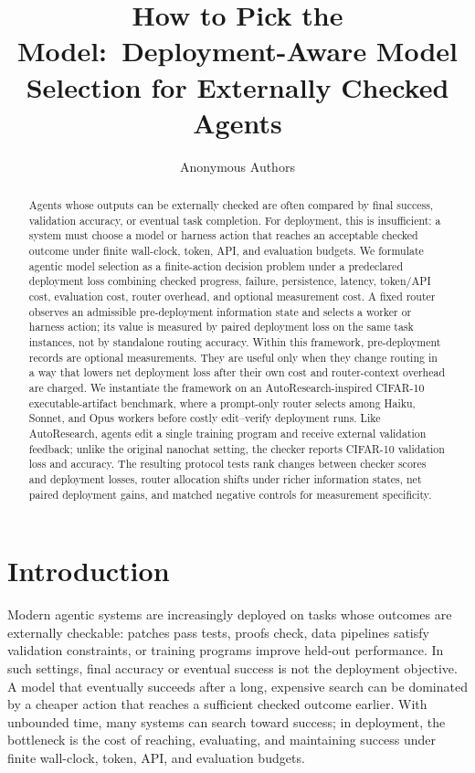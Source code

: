 \documentclass{article}
\title{How to Pick the Model:\
Deployment-Aware Model Selection for Externally Checked Agents}
\author{Anonymous Authors}
\begin{document}
\maketitle

\begin{abstract}
Agents whose outputs can be externally checked are often compared by final success, validation accuracy, or eventual task completion.
For deployment, this is insufficient: a system must choose a model or harness action that reaches an acceptable checked outcome under finite wall-clock, token, API, and evaluation budgets.
We formulate agentic model selection as a finite-action decision problem under a predeclared deployment loss combining checked progress, failure, persistence, latency, token/API cost, evaluation cost, router overhead, and optional measurement cost.
A fixed router observes an admissible pre-deployment information state and selects a worker or harness action; its value is measured by paired deployment loss on the same task instances, not by standalone routing accuracy.
Within this framework, pre-deployment records are optional measurements.
They are useful only when they change routing in a way that lowers net deployment loss after their own cost and router-context overhead are charged.
We instantiate the framework on an AutoResearch-inspired CIFAR-10 executable-artifact benchmark, where a prompt-only router selects among Haiku, Sonnet, and Opus workers before costly edit--verify deployment runs.
Like AutoResearch, agents edit a single training program and receive external validation feedback; unlike the original nanochat setting, the checker reports CIFAR-10 validation loss and accuracy.
The resulting protocol tests rank changes between checker scores and deployment losses, router allocation shifts under richer information states, net paired deployment gains, and matched negative controls for measurement specificity.
\end{abstract}

\section{Introduction}
\label{sec:intro}

Modern agentic systems are increasingly deployed on tasks whose outcomes are externally checkable: patches pass tests, proofs check, data pipelines satisfy validation constraints, or training programs improve held-out performance.
In such settings, final accuracy or eventual success is not the deployment objective.
A model that eventually succeeds after a long, expensive search can be dominated by a cheaper action that reaches a sufficient checked outcome earlier.
With unbounded time, many systems can search toward success; in deployment, the bottleneck is the cost of reaching, evaluating, and maintaining success under finite wall-clock, token, API, and evaluation budgets.
\end{document}
